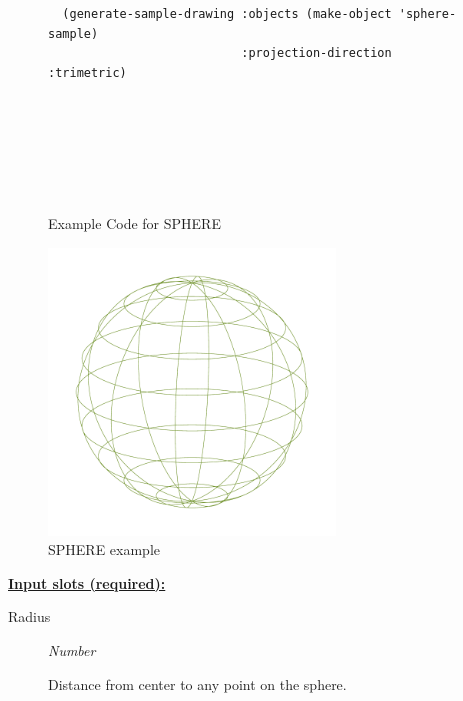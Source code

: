 \documentclass [11pt]{book}
\begin{document}
\begin{itemize}
\begin{figure}
\begin{lrbox}{\boxedverb}
\begin{minipage}{\linewidth}
{\begin{verbatim}
  (generate-sample-drawing :objects (make-object 'sphere-sample) 
                           :projection-direction :trimetric)





                  

\end{verbatim}}
\end{minipage}
\end{lrbox}
\fbox{\usebox{\boxedverb}}

\caption{Example Code for SPHERE}

\label{fig:example-code-SPHERE}

\end{figure}

\begin{figure}
\begin{center}
\includegraphics[width=3in,height=3in]{../images/example-sphere.pdf}
\end{center}

\caption{SPHERE example}

\label{fig:SPHERE}

\end{figure}





\textbf{
\underline{Input slots (required):}}

\begin{description}

\item [Radius]
\emph{Number}

 Distance from center to any point on the sphere.




\end{description}







\end{itemize}
\end{document}
